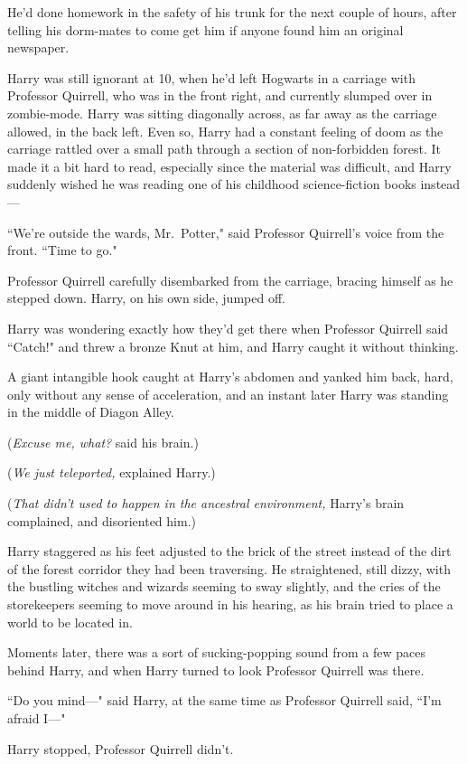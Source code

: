 He'd done homework in the safety of his trunk for the next couple of hours, after telling his dorm-mates to come get him if anyone found him an original newspaper.

Harry was still ignorant at 10\am, when he'd left Hogwarts in a carriage with Professor Quirrell, who was in the front right, and currently slumped over in zombie-mode. Harry was sitting diagonally across, as far away as the carriage allowed, in the back left. Even so, Harry had a constant feeling of doom as the carriage rattled over a small path through a section of non-forbidden forest. It made it a bit hard to read, especially since the material was difficult, and Harry suddenly wished he was reading one of his childhood science-fiction books instead—

``We're outside the wards, Mr.~Potter," said Professor Quirrell's voice from the front. ``Time to go."

Professor Quirrell carefully disembarked from the carriage, bracing himself as he stepped down. Harry, on his own side, jumped off.

Harry was wondering exactly how they'd get there when Professor Quirrell said ``Catch!" and threw a bronze Knut at him, and Harry caught it without thinking.

A giant intangible hook caught at Harry's abdomen and yanked him back, hard, only without any sense of acceleration, and an instant later Harry was standing in the middle of Diagon Alley.

(\emph{Excuse me, what?} said his brain.)

(\emph{We just teleported,} explained Harry.)

(\emph{That didn't used to happen in the ancestral environment,} Harry's brain complained, and disoriented him.)

Harry staggered as his feet adjusted to the brick of the street instead of the dirt of the forest corridor they had been traversing. He straightened, still dizzy, with the bustling witches and wizards seeming to sway slightly, and the cries of the storekeepers seeming to move around in his hearing, as his brain tried to place a world to be located in.

Moments later, there was a sort of sucking-popping sound from a few paces behind Harry, and when Harry turned to look Professor Quirrell was there.

``Do you mind—" said Harry, at the same time as Professor Quirrell said, ``I'm afraid I—"

Harry stopped, Professor Quirrell didn't.

